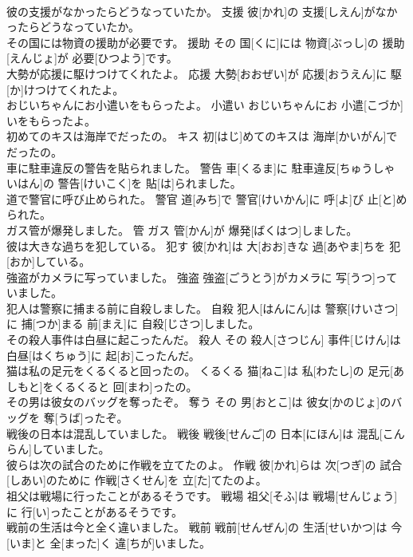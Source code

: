 \documentclass[8pt]{extreport}
\begin{document}
\begin{CJK}{UTF8}{min}
\\	彼の支援がなかったらどうなっていたか。	支援	彼[かれ]の 支援[しえん]がなかったらどうなっていたか。	
\\	その国には物資の援助が必要です。	援助	その 国[くに]には 物資[ぶっし]の 援助[えんじょ]が 必要[ひつよう]です。	
\\	大勢が応援に駆けつけてくれたよ。	応援	大勢[おおぜい]が 応援[おうえん]に 駆[か]けつけてくれたよ。	
\\	おじいちゃんにお小遣いをもらったよ。	小遣い	おじいちゃんにお 小遣[こづか]いをもらったよ。	
\\	初めてのキスは海岸でだったの。	キス	初[はじ]めてのキスは 海岸[かいがん]でだったの。	
\\	車に駐車違反の警告を貼られました。	警告	車[くるま]に 駐車違反[ちゅうしゃ いはん]の 警告[けいこく]を 貼[は]られました。	
\\	道で警官に呼び止められた。	警官	道[みち]で 警官[けいかん]に 呼[よ]び 止[と]められた。	
\\	ガス管が爆発しました。	管	ガス 管[かん]が 爆発[ばくはつ]しました。	
\\	彼は大きな過ちを犯している。	犯す	彼[かれ]は 大[おお]きな 過[あやま]ちを 犯[おか]している。	
\\	強盗がカメラに写っていました。	強盗	強盗[ごうとう]がカメラに 写[うつ]っていました。	
\\	犯人は警察に捕まる前に自殺しました。	自殺	犯人[はんにん]は 警察[けいさつ]に 捕[つか]まる 前[まえ]に 自殺[じさつ]しました。	
\\	その殺人事件は白昼に起こったんだ。	殺人	その 殺人[さつじん] 事件[じけん]は 白昼[はくちゅう]に 起[お]こったんだ。	
\\	猫は私の足元をくるくると回ったの。	くるくる	猫[ねこ]は 私[わたし]の 足元[あしもと]をくるくると 回[まわ]ったの。	
\\	その男は彼女のバッグを奪ったぞ。	奪う	その 男[おとこ]は 彼女[かのじょ]のバッグを 奪[うば]ったぞ。	
\\	戦後の日本は混乱していました。	戦後	戦後[せんご]の 日本[にほん]は 混乱[こんらん]していました。	
\\	彼らは次の試合のために作戦を立てたのよ。	作戦	彼[かれ]らは 次[つぎ]の 試合[しあい]のために 作戦[さくせん]を 立[た]てたのよ。	
\\	祖父は戦場に行ったことがあるそうです。	戦場	祖父[そふ]は 戦場[せんじょう]に 行[い]ったことがあるそうです。	
\\	戦前の生活は今と全く違いました。	戦前	戦前[せんぜん]の 生活[せいかつ]は 今[いま]と 全[まった]く 違[ちが]いました。	

\end{CJK}
\end{document}
